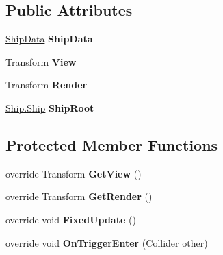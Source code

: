 \subsection*{Public Attributes}
\begin{DoxyCompactItemize}
\item 
\hypertarget{class_skyrates_1_1_client_1_1_entity_player_ship_aeffd5b12794a23deb6470310a0c2c627}{\hyperlink{class_ship_data}{Ship\-Data} {\bfseries Ship\-Data}}\label{class_skyrates_1_1_client_1_1_entity_player_ship_aeffd5b12794a23deb6470310a0c2c627}

\item 
\hypertarget{class_skyrates_1_1_client_1_1_entity_player_ship_a4b6a931e459724cf6195e70418076dac}{Transform {\bfseries View}}\label{class_skyrates_1_1_client_1_1_entity_player_ship_a4b6a931e459724cf6195e70418076dac}

\item 
\hypertarget{class_skyrates_1_1_client_1_1_entity_player_ship_a16233278935f1ef4c515a23d9f8e98c1}{Transform {\bfseries Render}}\label{class_skyrates_1_1_client_1_1_entity_player_ship_a16233278935f1ef4c515a23d9f8e98c1}

\item 
\hypertarget{class_skyrates_1_1_client_1_1_entity_player_ship_a88dec122cebf68895d44ddf345052064}{\hyperlink{class_skyrates_1_1_client_1_1_ship_1_1_ship}{Ship.\-Ship} {\bfseries Ship\-Root}}\label{class_skyrates_1_1_client_1_1_entity_player_ship_a88dec122cebf68895d44ddf345052064}

\end{DoxyCompactItemize}
\subsection*{Protected Member Functions}
\begin{DoxyCompactItemize}
\item 
\hypertarget{class_skyrates_1_1_client_1_1_entity_player_ship_a6f8eabb948e3acf794bd6c230980b0e3}{override Transform {\bfseries Get\-View} ()}\label{class_skyrates_1_1_client_1_1_entity_player_ship_a6f8eabb948e3acf794bd6c230980b0e3}

\item 
\hypertarget{class_skyrates_1_1_client_1_1_entity_player_ship_a7550d6b6cabb315bc4df868dde129f23}{override Transform {\bfseries Get\-Render} ()}\label{class_skyrates_1_1_client_1_1_entity_player_ship_a7550d6b6cabb315bc4df868dde129f23}

\item 
\hypertarget{class_skyrates_1_1_client_1_1_entity_player_ship_a998fa020992060cd89761997097ae686}{override void {\bfseries Fixed\-Update} ()}\label{class_skyrates_1_1_client_1_1_entity_player_ship_a998fa020992060cd89761997097ae686}

\item 
\hypertarget{class_skyrates_1_1_client_1_1_entity_player_ship_a8eb84bd75cd1d5ebae5871f5eb75befe}{override void {\bfseries On\-Trigger\-Enter} (Collider other)}\label{class_skyrates_1_1_client_1_1_entity_player_ship_a8eb84bd75cd1d5ebae5871f5eb75befe}

\end{DoxyCompactItemize}
